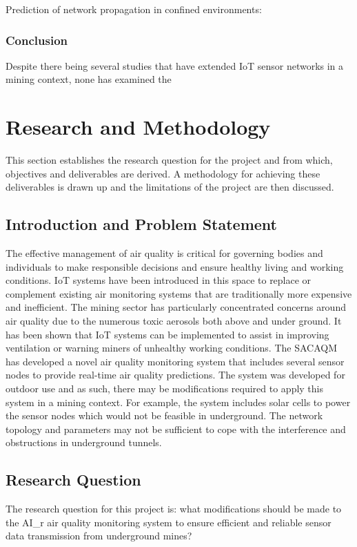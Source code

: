 \documentclass[a4paper,twoside,12pt]{report}
\begin{document}
Prediction of network propagation in confined environments:
\citep{MineRadioPredictionModel1}
\citep{MineRadioPredictionModel2}

\subsection{Conclusion}
Despite there being several studies that have extended IoT sensor networks in a mining context, none has examined the 

\chapter{Research and Methodology}
This section establishes the research question for the project and from which, objectives and deliverables are derived. A methodology for achieving these deliverables is drawn up and the limitations of the project are then discussed.

\section{Introduction and Problem Statement}
The effective management of air quality is critical for governing bodies and individuals to make responsible decisions and ensure healthy living and working conditions. IoT systems have been introduced in this space to replace or complement existing air monitoring systems that are traditionally more expensive and inefficient. 
\newline \newline
The mining sector has particularly concentrated concerns around air quality due to the numerous toxic aerosols both above and under ground. It has been shown that IoT systems can be implemented to assist in improving ventilation or warning miners of unhealthy working conditions. 
\newline \newline
The SACAQM has developed a novel air quality monitoring system that includes several sensor nodes to provide real-time air quality predictions. The system was developed for outdoor use and as such, there may be modifications required to apply this system in a mining context. For example, the system includes solar cells to power the sensor nodes which would not be feasible in underground. The network topology and parameters may not be sufficient to cope with the interference and obstructions in underground tunnels.

\section{Research Question}
The research question for this project is: what modifications should be made to the AI\_r air quality monitoring system to ensure efficient and reliable sensor data transmission from underground mines?
\end{document}
